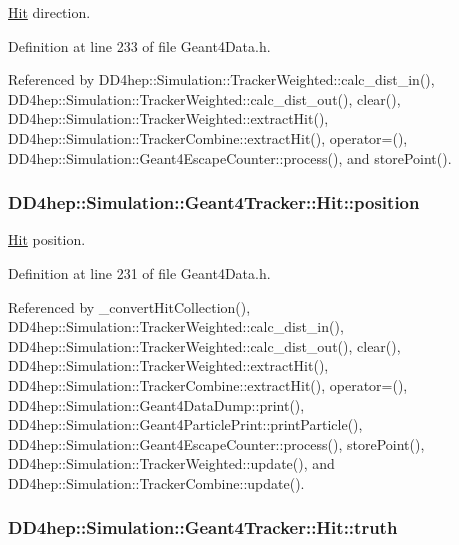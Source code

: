 \hyperlink{class_d_d4hep_1_1_simulation_1_1_geant4_tracker_1_1_hit}{Hit} direction. 

Definition at line 233 of file Geant4Data.h.

Referenced by DD4hep::Simulation::TrackerWeighted::calc\_\-dist\_\-in(), DD4hep::Simulation::TrackerWeighted::calc\_\-dist\_\-out(), clear(), DD4hep::Simulation::TrackerWeighted::extractHit(), DD4hep::Simulation::TrackerCombine::extractHit(), operator=(), DD4hep::Simulation::Geant4EscapeCounter::process(), and storePoint().\hypertarget{class_d_d4hep_1_1_simulation_1_1_geant4_tracker_1_1_hit_a7f992369c5178cac0cc00ffc8a9c36a0}{
\subsubsection[{position}]{ {\bf DD4hep::Simulation::Geant4Tracker::Hit::position}}}
\label{class_d_d4hep_1_1_simulation_1_1_geant4_tracker_1_1_hit_a7f992369c5178cac0cc00ffc8a9c36a0}


\hyperlink{class_d_d4hep_1_1_simulation_1_1_geant4_tracker_1_1_hit}{Hit} position. 

Definition at line 231 of file Geant4Data.h.

Referenced by \_\-convertHitCollection(), DD4hep::Simulation::TrackerWeighted::calc\_\-dist\_\-in(), DD4hep::Simulation::TrackerWeighted::calc\_\-dist\_\-out(), clear(), DD4hep::Simulation::TrackerWeighted::extractHit(), DD4hep::Simulation::TrackerCombine::extractHit(), operator=(), DD4hep::Simulation::Geant4DataDump::print(), DD4hep::Simulation::Geant4ParticlePrint::printParticle(), DD4hep::Simulation::Geant4EscapeCounter::process(), storePoint(), DD4hep::Simulation::TrackerWeighted::update(), and DD4hep::Simulation::TrackerCombine::update().\hypertarget{class_d_d4hep_1_1_simulation_1_1_geant4_tracker_1_1_hit_ab786ed42d3c88d911b662e8a083bc54e}{
\subsubsection[{truth}]{ {\bf DD4hep::Simulation::Geant4Tracker::Hit::truth}}}
\label{class_d_d4hep_1_1_simulation_1_1_geant4_tracker_1_1_hit_ab786ed42d3c88d911b662e8a083bc54e}


